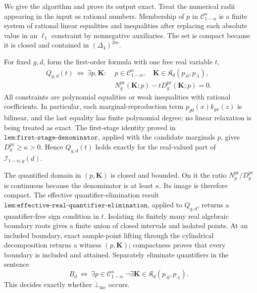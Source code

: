 We give the algorithm and prove its output exact.  Treat the numerical radii appearing in the input as rational numbers.  Membership of \(p\) in \(\mathcal C_{1-\alpha}^{\kappa}\) is a finite system of rational linear equalities and inequalities after replacing each absolute value in an \(\ell_1\) constraint by nonnegative auxiliaries.  The set is compact because it is closed and contained in \((\Delta_4)^{2m}\).

For fixed \(g,d\), form the first-order formula with one free real variable \(t\),
\[
\begin{split}
 Q_{g,d}(t)\ \Longleftrightarrow\ \exists p,\mathbf K:\;&
 p\in\mathcal C_{1-\alpha}^{\kappa},\quad
 \mathbf K\in\mathfrak K_d(p_{\cdot0},p_{\cdot1}),\\
 &N_g^{\mathrm{pr}}(\mathbf K;p)-tD_g^{\mathrm{pr}}(\mathbf K;p)=0.
\end{split}
\]
All constraints are polynomial equalities or weak inequalities with rational coefficients.  In particular, each marginal-reproduction term \(p_{g0}(x)k_{gx}(z)\) is bilinear, and the last equality has finite polynomial degree; no linear relaxation is being treated as exact.  The first-stage identity proved in \(\texttt{lem:first-stage-denominator}\), applied with the candidate marginals \(p\), gives \(D_g^{\mathrm{pr}}\ge\kappa>0\).  Hence \(Q_{g,d}(t)\) holds exactly for the real-valued part of \(\mathcal I_{1-\alpha,g}(d)\).

The quantified domain in \((p,\mathbf K)\) is closed and bounded.  On it the ratio \(N_g^{\mathrm{pr}}/D_g^{\mathrm{pr}}\) is continuous because the denominator is at least \(\kappa\).  Its image is therefore compact.  The effective quantifier-elimination result \(\texttt{lem:effective-real-quantifier-elimination}\), applied to \(Q_{g,d}\), returns a quantifier-free sign condition in \(t\).  Isolating its finitely many real algebraic boundary roots gives a finite union of closed intervals and isolated points.  At an included boundary, exact sample-point lifting through the cylindrical decomposition returns a witness \((p,\mathbf K)\); compactness proves that every boundary is included and attained.  Separately eliminate quantifiers in the sentence
\[
 B_d\ \Longleftrightarrow\
 \exists p\in\mathcal C_{1-\alpha}^{\kappa}\;
 \neg\exists\mathbf K\in\mathfrak K_d(p_{\cdot0},p_{\cdot1}).
\]
This decides exactly whether \(\bot_{\mathrm{inc}}\) occurs.

